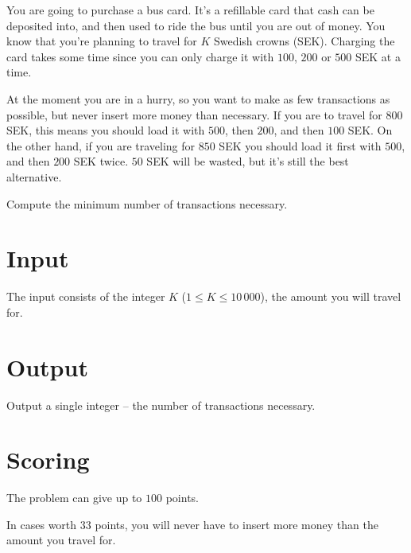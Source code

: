 You are going to purchase a bus card.
It's a refillable card that cash can be deposited into, and then used to ride the bus until you are out of money.
You know that you're planning to travel for $K$ Swedish crowns (SEK).
Charging the card takes some time since you can only charge it with $100$, $200$ or $500$ SEK at a time.

At the moment you are in a hurry, so you want to make as few transactions as possible, but never insert more money than necessary.
If you are to travel for $800$ SEK, this means you should load it with $500$, then $200$, and then $100$ SEK.
On the other hand, if you are traveling for $850$ SEK you should load it first with $500$, and then $200$ SEK twice.
$50$ SEK will be wasted, but it's still the best alternative.

Compute the minimum number of transactions necessary.

\section*{Input}
The input consists of the integer $K$ ($1 \le K \le 10\,000$), the amount you will travel for.

\section*{Output}
Output a single integer -- the number of transactions necessary.

\section*{Scoring}
The problem can give up to $100$ points.

In cases worth $33$ points, you will never have to insert more money than the amount you travel for.
